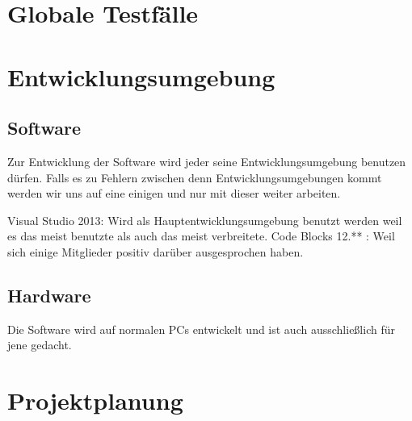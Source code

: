 \documentclass[a4paper,12pt]{scrreprt}
\begin{document}
\chapter{Globale Testfälle}

	
\chapter{Entwicklungsumgebung}
	
	\section{Software}
		Zur Entwicklung der Software wird jeder seine Entwicklungsumgebung benutzen dürfen. Falls es zu Fehlern zwischen denn Entwicklungsumgebungen kommt werden wir uns auf eine einigen und nur mit dieser weiter arbeiten. 
		
		Visual Studio 2013: Wird als Hauptentwicklungsumgebung benutzt werden weil es das meist benutzte als auch das meist verbreitete.  
		Code Blocks 12.** : Weil sich einige Mitglieder positiv darüber ausgesprochen haben.
		
		
		
		
	\section{Hardware}
		
		
		Die Software wird auf normalen PCs entwickelt und ist auch ausschließlich für jene gedacht.
		
		
		
\chapter{Projektplanung}



	
	
\end{document}
